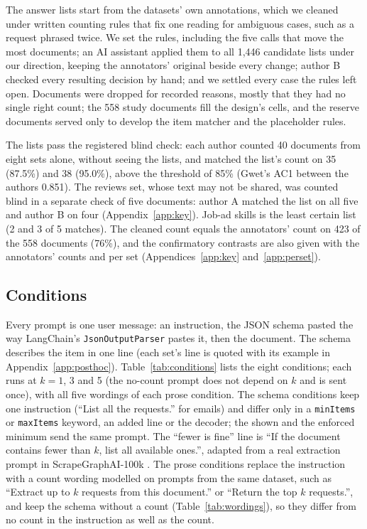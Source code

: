 The answer lists start from the datasets' own annotations, which we cleaned under written counting rules that fix one reading for ambiguous cases, such as a request phrased twice.
We set the rules, including the five calls that move the most documents; an AI assistant applied them to all 1,446 candidate lists under our direction, keeping the annotators' original beside every change; author B checked every resulting decision by hand; and we settled every case the rules left open.
Documents were dropped for recorded reasons, mostly that they had no single right count; the 558 study documents fill the design's cells, and the reserve documents served only to develop the item matcher and the placeholder rules.

The lists pass the registered blind check: each author counted 40 documents from eight sets alone, without seeing the lists, and matched the list's count on 35 (87.5\%) and 38 (95.0\%), above the threshold of 85\% (Gwet's AC1 between the authors 0.851).
The reviews set, whose text may not be shared, was counted blind in a separate check of five documents: author A matched the list on all five and author B on four (Appendix~\ref{app:key}).
Job-ad skills is the least certain list (2 and 3 of 5 matches).
The cleaned count equals the annotators' count on 423 of the 558 documents (76\%), and the confirmatory contrasts are also given with the annotators' counts and per set (Appendices~\ref{app:key} and~\ref{app:perset}).

\subsection{Conditions}
\label{sec:conditions}

Every prompt is one user message: an instruction, the JSON schema pasted the way LangChain's \texttt{JsonOutputParser} pastes it, then the document.
The schema describes the item in one line (each set's line is quoted with its example in Appendix~\ref{app:posthoc}).
Table~\ref{tab:conditions} lists the eight conditions; each runs at $k = 1$, 3 and 5 (the no-count prompt does not depend on $k$ and is sent once), with all five wordings of each prose condition.
The schema conditions keep one instruction (``List all the requests.'' for emails) and differ only in a \texttt{minItems} or \texttt{maxItems} keyword, an added line or the decoder; the shown and the enforced minimum send the same prompt.
The ``fewer is fine'' line is ``If the document contains fewer than $k$, list all available ones.'', adapted from a real extraction prompt in ScrapeGraphAI-100k \citep{brach2026scrapegraphai}.
The prose conditions replace the instruction with a count wording modelled on prompts from the same dataset, such as ``Extract up to $k$ requests from this document.'' or ``Return the top $k$ requests.'', and keep the schema without a count (Table~\ref{tab:wordings}), so they differ from no count in the instruction as well as the count.

